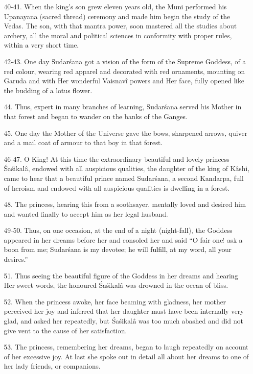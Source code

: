40-41. When the king's son grew eleven years old, the Muni performed his Upanayana (sacred thread) ceremony and made him begin the study of the Vedas. The son, with that mantra power, soon mastered all the studies about archery, all the moral and political sciences in conformity with proper rules, within a very short time.

42-43. One day Sudar\'sana got a vision of the form of the Supreme Goddess, of a red colour, wearing red apparel and decorated with red ornaments, mounting on Garuda and with Her wonderful Vaisnav\^i powers and Her face, fully opened like the budding of a lotus flower.

44. Thus, expert in many branches of learning, Sudar\'sana served his Mother in that forest and began to wander on the banks of the Ganges.

45. One day the Mother of the Universe gave the bows, sharpened arrows, quiver and a mail coat of armour to that boy in that forest.

46-47. O King! At this time the extraordinary beautiful and lovely princess \'Sa\'sikal\^a, endowed with all auspicious qualities, the daughter of the king of K\^ashi, came to hear that a beautiful prince named Sudar\'sana, a second Kandarpa, full of heroism and endowed with all auspicious qualities is dwelling in a forest.

48. The princess, hearing this from a soothsayer, mentally loved and desired him and wanted finally to accept him as her legal husband.

49-50. Thus, on one occasion, at the end of a night (night-fall), the Goddess appeared in her dreams before her and consoled her and said ``O fair one! ask a boon from me; Sudar\'sana is my devotee; he will fulfill, at my word, all your desires.''

51. Thus seeing the beautiful figure of the Goddess in her dreams and hearing Her sweet words, the honoured \'Sa\'sikal\^a was drowned in the ocean of bliss.

52. When the princess awoke, her face beaming with gladness, her mother perceived her joy and inferred that her daughter must have been internally very glad, and asked her repeatedly, but \'Sa\'sikal\^a was too much abashed and did not give vent to the cause of her satisfaction.

53. The princess, remembering her dreams, began to laugh repeatedly on account of her excessive joy. At last she spoke out in detail all about her dreams to one of her lady friends, or companions.

